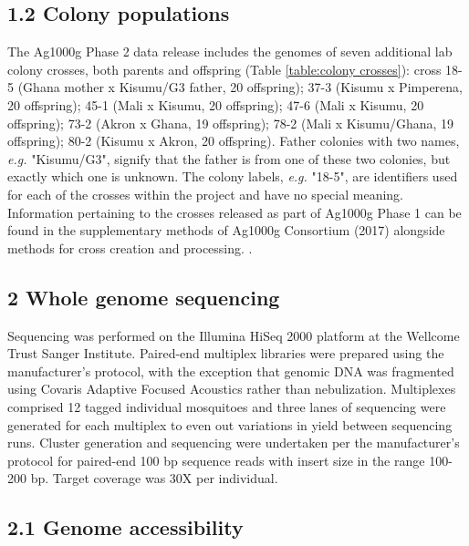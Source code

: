 \documentclass[a4paper,11pt,abstracton,hidelinks]{scrartcl}
\begin{document}
\subsection*{1.2 Colony populations}

The Ag1000g Phase 2 data release includes the genomes of seven additional lab colony crosses, both parents and offspring (Table \ref{table:colony crosses}):
%
cross 18-5 (Ghana mother x Kisumu/G3 father, 20 offspring); 37-3 (Kisumu x Pimperena, 20 offspring); 45-1 (Mali x Kisumu, 20 offspring); 47-6 (Mali x Kisumu, 20 offspring); 73-2 (Akron x Ghana, 19 offspring); 78-2 (Mali x Kisumu/Ghana, 19 offspring); 80-2 (Kisumu x Akron, 20 offspring).
%
Father colonies with two names, \textit{e.g.} "Kisumu/G3", signify that the father is from one of these two colonies, but exactly which one is unknown.
%
The	colony labels, \textit{e.g.}	"18-5", are	identifiers used for	
each of the crosses	within the project and	have no special meaning.	
%
Information pertaining to the crosses released as part of Ag1000g Phase 1 can be found in the supplementary methods of Ag1000g Consortium (2017) alongside methods for cross creation and processing. \cite{Ag1000gConsortium2017}.

\subsection*{2 Whole genome sequencing}

%
Sequencing was performed on the Illumina HiSeq 2000 platform at the Wellcome Trust Sanger Institute.
%
Paired-end multiplex libraries were prepared using the manufacturer's protocol, with the exception that genomic DNA was fragmented using Covaris Adaptive Focused Acoustics rather than nebulization.
%
Multiplexes comprised 12 tagged individual mosquitoes and three lanes of sequencing were generated for each multiplex to even out variations in yield between sequencing runs.
%
Cluster generation and sequencing were undertaken per the manufacturer's protocol for paired-end 100 bp sequence reads with insert size in the range 100-200 bp.
%
Target coverage was 30X per individual.


\subsection*{2.1 Genome accessibility}
\end{document}
